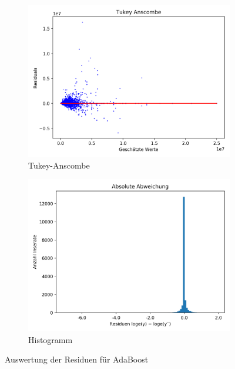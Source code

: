 \begin{figure}[h]
\begin{subfigure}{.5\textwidth}
  \centering
  \includegraphics[width=\linewidth]{images/adaboost_tukey_anscombe_1.png}
  \caption[Tukey-Anscombe]{Tukey-Anscombe}
  \label{fig:ada_tukey-anscombe_1}
\end{subfigure}
\begin{subfigure}{.5\textwidth}
  \centering
  \includegraphics[width=\linewidth]{images/adaboost_verteilung_residuals_log_1.png}
  \caption[Histogramm]{Histogramm}
  \label{fig:ada_histo_1}
\end{subfigure}
\caption[Auswertung der Residuen für AdaBoost]{Auswertung der Residuen für AdaBoost}
\label{fig:adaboost_1}
\end{figure}


